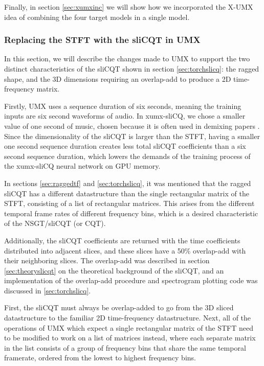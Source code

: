 \documentclass[report.tex]{subfiles}
\begin{document}
Finally, in section \ref{sec:xumxinc} we will show how we incorporated the X-UMX idea of combining the four target models in a single model.

\subsubsection{Replacing the STFT with the sliCQT in UMX}
\label{sec:replacestft}

In this section, we will describe the changes made to UMX to support the two distinct characteristics of the sliCQT shown in section \ref{sec:torchslicq}: the ragged shape, and the 3D dimensions requiring an overlap-add to produce a 2D time-frequency matrix.

Firstly, UMX uses a sequence duration of six seconds, meaning the training inputs are six second waveforms of audio. In xumx-sliCQ, we chose a smaller value of one second of music, chosen because it is often used in demixing papers \parencite{plumbley1, plumbley2, demucs}. Since the dimensionality of the sliCQT is larger than the STFT, having a smaller one second sequence duration creates less total sliCQT coefficients than a six second sequence duration, which lowers the demands of the training process of the xumx-sliCQ neural network on GPU memory.

In sections \ref{sec:raggedtf} and \ref{sec:torchslicq}, it was mentioned that the ragged sliCQT has a different datastructure than the single rectangular matrix of the STFT, consisting of a list of rectangular matrices. This arises from the different temporal frame rates of different frequency bins, which is a desired characteristic of the NSGT/sliCQT (or CQT).

Additionally, the sliCQT coefficients are returned with the time coefficients distributed into adjacent slices, and these slices have a 50\% overlap-add with their neighboring slices. The overlap-add was described in section \ref{sec:theoryslicqt} on the theoretical background of the sliCQT, and an implementation of the overlap-add procedure and spectrogram plotting code was discussed in \ref{sec:torchslicq}.

First, the sliCQT must always be overlap-added to go from the 3D sliced datastructure to the familiar 2D time-frequency datastructure. Next, all of the operations of UMX which expect a single rectangular matrix of the STFT need to be modified to work on a list of matrices instead, where each separate matrix in the list consists of a group of frequency bins that share the same temporal framerate, ordered from the lowest to highest frequency bins.
\end{document}
